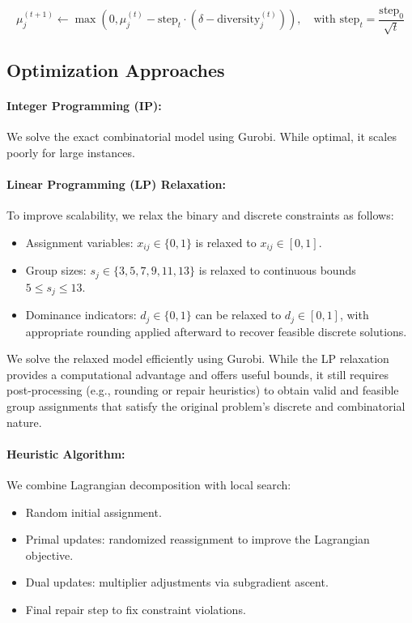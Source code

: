\[
\mu_j^{(t+1)} \leftarrow \max(0, \mu_j^{(t)} - \text{step}_t \cdot (\delta - \text{diversity}_j^{(t)})), \quad \text{with } \text{step}_t = \frac{\text{step}_0}{\sqrt{t}}
\]

\subsection*{Optimization Approaches}

\paragraph{Integer Programming (IP):}
We solve the exact combinatorial model using Gurobi. While optimal, it scales poorly for large instances.

\paragraph{Linear Programming (LP) Relaxation:}
To improve scalability, we relax the binary and discrete constraints as follows:  
\begin{itemize}  
    \item Assignment variables: \( x_{ij} \in \{0, 1\} \) is relaxed to \( x_{ij} \in [0, 1] \).  
    \item Group sizes: \( s_j \in \{3, 5, 7, 9, 11, 13\} \) is relaxed to continuous bounds \( 5 \leq s_j \leq 13 \).  
    \item Dominance indicators: \( d_j \in \{0, 1\} \) can be relaxed to \( d_j \in [0, 1] \), with appropriate rounding applied afterward to recover feasible discrete solutions.  
\end{itemize}  
We solve the relaxed model efficiently using Gurobi. While the LP relaxation provides a computational advantage and offers useful bounds, it still requires post-processing (e.g., rounding or repair heuristics) to obtain valid and feasible group assignments that satisfy the original problem's discrete and combinatorial nature.

\paragraph{Heuristic Algorithm:}
We combine Lagrangian decomposition with local search:
\begin{itemize}
    \item Random initial assignment.
    \item Primal updates: randomized reassignment to improve the Lagrangian objective.
    \item Dual updates: multiplier adjustments via subgradient ascent.
    \item Final repair step to fix constraint violations.
\end{itemize}

